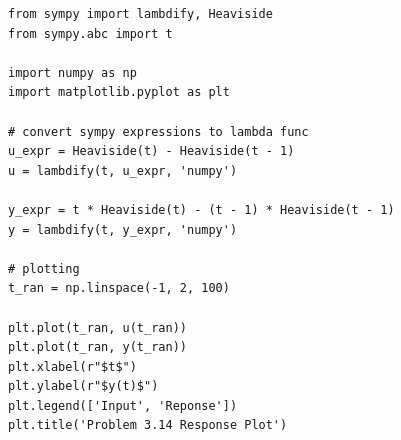 \documentclass[12pt]{article}
\begin{document}
\begin{enumerate}
\begin{verbatim}
from sympy import lambdify, Heaviside
from sympy.abc import t

import numpy as np
import matplotlib.pyplot as plt

# convert sympy expressions to lambda func
u_expr = Heaviside(t) - Heaviside(t - 1)
u = lambdify(t, u_expr, 'numpy')

y_expr = t * Heaviside(t) - (t - 1) * Heaviside(t - 1)
y = lambdify(t, y_expr, 'numpy')

# plotting
t_ran = np.linspace(-1, 2, 100)

plt.plot(t_ran, u(t_ran))
plt.plot(t_ran, y(t_ran))
plt.xlabel(r"$t$")
plt.ylabel(r"$y(t)$")
plt.legend(['Input', 'Reponse'])
plt.title('Problem 3.14 Response Plot')
\end{verbatim}


\end{enumerate}
\end{document}
